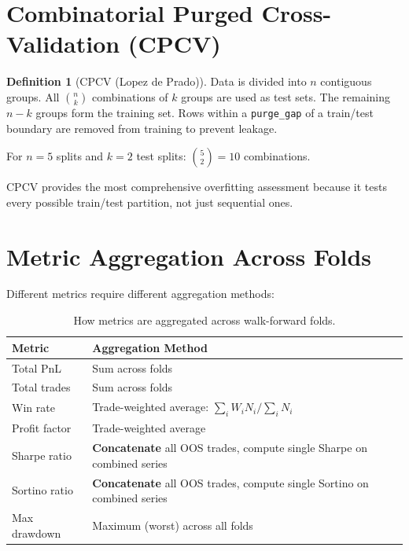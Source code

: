 \documentclass[12pt,a4paper]{report}
\theoremstyle{definition}
\newtheorem{definition}{Definition}[chapter]
\newcommand{\code}[1]{\texttt{#1}}
\begin{document}
\section{Combinatorial Purged Cross-Validation (CPCV)}
\label{sec:cpcv}

\begin{definition}[CPCV (Lopez de Prado)]
Data is divided into $n$ contiguous groups. All $\binom{n}{k}$ combinations of $k$ groups are used as test sets. The remaining $n - k$ groups form the training set. Rows within a \code{purge\_gap} of a train/test boundary are removed from training to prevent leakage.
\end{definition}

For $n = 5$ splits and $k = 2$ test splits: $\binom{5}{2} = 10$ combinations.

CPCV provides the most comprehensive overfitting assessment because it tests every possible train/test partition, not just sequential ones.

\section{Metric Aggregation Across Folds}
\label{sec:metric-aggregation}

Different metrics require different aggregation methods:

\begin{table}[H]
\centering
\caption{How metrics are aggregated across walk-forward folds.}
\label{tab:aggregation}
\begin{tabularx}{\textwidth}{lX}
\toprule
\textbf{Metric} & \textbf{Aggregation Method} \\
\midrule
Total PnL       & Sum across folds \\
Total trades     & Sum across folds \\
Win rate         & Trade-weighted average: $\sum_i W_i N_i / \sum_i N_i$ \\
Profit factor    & Trade-weighted average \\
Sharpe ratio     & \textbf{Concatenate} all OOS trades, compute single Sharpe on combined series \\
Sortino ratio    & \textbf{Concatenate} all OOS trades, compute single Sortino on combined series \\
Max drawdown     & Maximum (worst) across all folds \\
\bottomrule
\end{tabularx}
\end{table}
\end{document}

